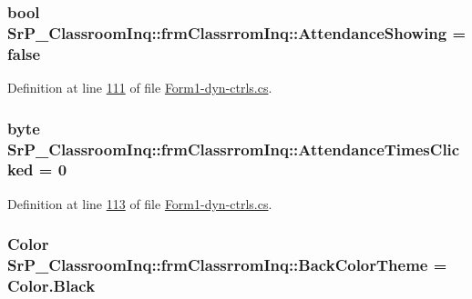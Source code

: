 \hypertarget{class_sr_p___classroom_inq_1_1frm_classrrom_inq_a24415681575df1fd435d1b1da60dfde3}{
\subsubsection[{\-Attendance\-Showing}]{\setlength{\rightskip}{0pt plus 5cm}bool {\bf \-Sr\-P\-\_\-\-Classroom\-Inq\-::frm\-Classrrom\-Inq\-::\-Attendance\-Showing} = false}}
\label{class_sr_p___classroom_inq_1_1frm_classrrom_inq_a24415681575df1fd435d1b1da60dfde3}


\-Definition at line \hyperlink{_form1-dyn-ctrls_8cs_source_l00111}{111} of file \hyperlink{_form1-dyn-ctrls_8cs_source}{\-Form1-\/dyn-\/ctrls.\-cs}.

\hypertarget{class_sr_p___classroom_inq_1_1frm_classrrom_inq_ade18c1a241b76944c2731681e1767652}{
\subsubsection[{\-Attendance\-Times\-Clicked}]{\setlength{\rightskip}{0pt plus 5cm}byte {\bf \-Sr\-P\-\_\-\-Classroom\-Inq\-::frm\-Classrrom\-Inq\-::\-Attendance\-Times\-Clicked} = 0}}
\label{class_sr_p___classroom_inq_1_1frm_classrrom_inq_ade18c1a241b76944c2731681e1767652}


\-Definition at line \hyperlink{_form1-dyn-ctrls_8cs_source_l00113}{113} of file \hyperlink{_form1-dyn-ctrls_8cs_source}{\-Form1-\/dyn-\/ctrls.\-cs}.

\hypertarget{class_sr_p___classroom_inq_1_1frm_classrrom_inq_a29b5dc6ea05e60bb2577a5bef3532d7b}{
\subsubsection[{\-Back\-Color\-Theme}]{\setlength{\rightskip}{0pt plus 5cm}\-Color {\bf \-Sr\-P\-\_\-\-Classroom\-Inq\-::frm\-Classrrom\-Inq\-::\-Back\-Color\-Theme} = \-Color.\-Black}}
\label{class_sr_p___classroom_inq_1_1frm_classrrom_inq_a29b5dc6ea05e60bb2577a5bef3532d7b}


